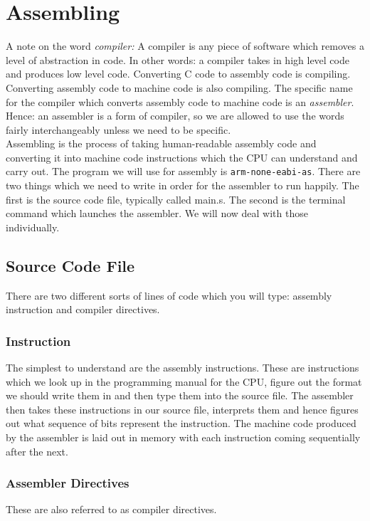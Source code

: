 \chapter{Assembling}
A note on the word \textit{compiler:} A compiler is any piece of software which removes a level of abstraction in code. In other words: a compiler takes in high level code and produces low level code. Converting C code to assembly code is compiling. Converting assembly code to machine code is also compiling. The specific name for the compiler which converts assembly code to machine code is an \emph{assembler}. Hence: an assembler is a form of compiler, so we are allowed to use the words fairly interchangeably unless we need to be specific. \\
Assembling is the process of taking human-readable assembly code and converting it into machine code instructions which the CPU can understand and carry out. 
The program we will use for assembly is \texttt{arm-none-eabi-as}. 
There are two things which we need to write in order for the assembler to run happily. The first is the source code file, typically called main.s. The second is the terminal command which launches the assembler.
We will now deal with those individually.

\section{Source Code File}
There are two different sorts of lines of code which you will type: assembly instruction and compiler directives.

\subsection{Instruction}
The simplest to understand are the assembly instructions. These are instructions which we look up in the programming manual for the CPU, figure out the format we should write them in and then type them into the source file. The assembler then takes these instructions in our source file, interprets them and hence figures out what sequence of bits represent the instruction. 
The machine code produced by the assembler is laid out in memory with each instruction coming sequentially after the next. 

\subsection{Assembler Directives}
These are also referred to as compiler directives. 

